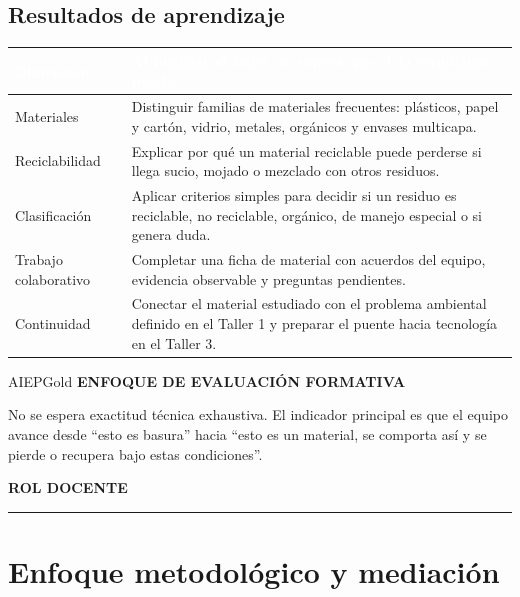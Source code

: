 ﻿\documentclass[10pt,a4paper]{article}
\newcommand{\kicker}[1]{%
  {\color{AIEPRed}\scriptsize\bfseries\MakeUppercase{#1}}\par\vspace{2.5mm}
  {\color{AIEPRed}\rule{13mm}{1.2pt}}\vspace{3mm}
}
\newcommand{\labeltext}[1]{%
  {\scriptsize\bfseries\color{AIEPSlate}\MakeUppercase{#1}}\par\vspace{1.3mm}
}
\newcommand{\pagebreaksection}{\newpage}
\begin{document}
\vspace{4mm}
\subsection*{Resultados de aprendizaje}
\begin{tabularx}{\textwidth}{L{31mm}Y}
\textcolor{White}{\bfseries Dimensión} & \textcolor{White}{\bfseries Al finalizar el taller, se espera que el/la estudiante pueda...} \\
\hline
Materiales & Distinguir familias de materiales frecuentes: plásticos, papel y cartón, vidrio, metales, orgánicos y envases multicapa. \\
\hline
Reciclabilidad & Explicar por qué un material reciclable puede perderse si llega sucio, mojado o mezclado con otros residuos. \\
\hline
Clasificación & Aplicar criterios simples para decidir si un residuo es reciclable, no reciclable, orgánico, de manejo especial o si genera duda. \\
\hline
Trabajo colaborativo & Completar una ficha de material con acuerdos del equipo, evidencia observable y preguntas pendientes. \\
\hline
Continuidad & Conectar el material estudiado con el problema ambiental definido en el Taller 1 y preparar el puente hacia tecnología en el Taller 3. \\
\hline
\end{tabularx}

\vspace{4mm}
\begin{softcard}{AIEPGold}
\labeltext{Enfoque de evaluación formativa}
No se espera exactitud técnica exhaustiva. El indicador principal es que el equipo avance desde ``esto es basura'' hacia ``esto es un material, se comporta así y se pierde o recupera bajo estas condiciones''.
\end{softcard}

\pagebreaksection

\kicker{Rol docente}
\section*{Enfoque metodológico y mediación}
\end{document}
